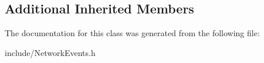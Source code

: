 \subsection*{Additional Inherited Members}


The documentation for this class was generated from the following file\-:\begin{DoxyCompactItemize}
\item 
include/Network\-Events.\-h\end{DoxyCompactItemize}
